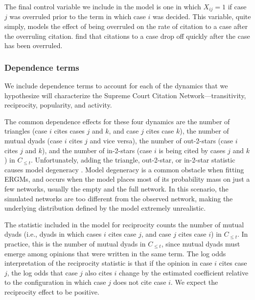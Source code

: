 \documentclass[headsepline=true, abstracton]{scrartcl}
\begin{document}
The final control variable we include in the model is one in which $X_{ij} = 1$ if case $j$ was overruled prior to the term in which case $i$ was decided. This variable, quite simply, models the effect of being overruled on the rate of citation to a case after the overruling citation. \citet{fowler2008authority} find that citations to a case drop off quickly after the case has been overruled.


\subsubsection{Dependence terms}\label{dependence_terms}

We include dependence terms to account for each of the dynamics that we hypothesize will characterize the Supreme Court Citation Network---transitivity, reciprocity, popularity, and activity. %

The common dependence effects for these four dynamics are the number of triangles (case $i$ cites cases $j$ and $k$, and case $j$ cites case $k$), the number of mutual dyads (case $i$ cites $j$ and vice versa), the number of out-2-stars (case $i$ cites $j$ and $k$), and the number of in-2-stars (case $i$ is being cited by cases $j$ and $k$) in $C_{\leq t}$. Unfortunately, adding the triangle, out-2-star, or in-2-star statistic causes model degeneracy \citep{Handcock.2003}. Model degeneracy is a common obstacle when fitting ERGMs, and occurs when the model places most of its probability mass on just a few networks, usually the empty and the full network. In this scenario, the simulated networks are too different from the observed network, making the underlying distribution defined by the model extremely unrealistic.

The statistic included in the model for reciprocity counts the number of mutual dyads (i.e., dyads in which cases $i$ cites case $j$, and case $j$ cites case $i$) in $C_{\leq t}$. In practice, this is the number of mutual dyads in $C_{\leq t}$, since mutual dyads must emerge among opinions that were written in the same term. The log odds interpretation of the reciprocity statistic is that if the opinion in case $i$ cites case $j$, the log odds that case $j$ also cites $i$ change by the estimated coefficient relative to the configuration in which case $j$ does not cite case $i$. We expect the reciprocity effect to be positive.
\end{document}
